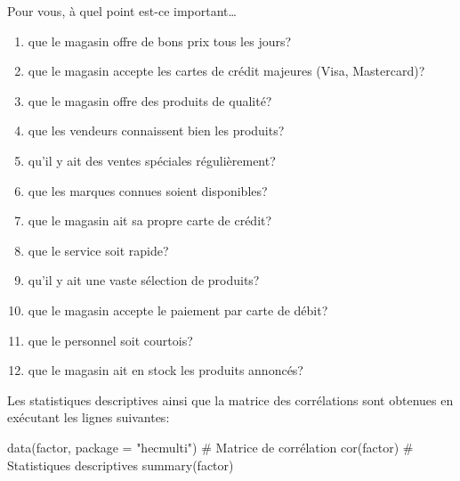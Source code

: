 \documentclass[
  11pt,
  letterpaper,
]{scrbook}
\newenvironment{Shaded}{\begin{snugshade}}{\end{snugshade}}
\newcommand{\AttributeTok}[1]{\textcolor[rgb]{0.40,0.45,0.13}{#1}}
\newcommand{\CommentTok}[1]{\textcolor[rgb]{0.37,0.37,0.37}{#1}}
\newcommand{\FunctionTok}[1]{\textcolor[rgb]{0.28,0.35,0.67}{#1}}
\newcommand{\NormalTok}[1]{\textcolor[rgb]{0.00,0.23,0.31}{#1}}
\newcommand{\StringTok}[1]{\textcolor[rgb]{0.13,0.47,0.30}{#1}}
\providecommand{\tightlist}{%
  \setlength{\itemsep}{0pt}\setlength{\parskip}{0pt}}\usepackage{longtable,booktabs,array}
\theoremstyle{definition}
\theoremstyle{remark}
\begin{document}
Pour vous, à quel point est-ce important\ldots

\begin{enumerate}
\def\labelenumi{\arabic{enumi}.}
\tightlist
\item
  que le magasin offre de bons prix tous les jours?
\item
  que le magasin accepte les cartes de crédit majeures (Visa,
  Mastercard)?
\item
  que le magasin offre des produits de qualité?
\item
  que les vendeurs connaissent bien les produits?
\item
  qu'il y ait des ventes spéciales régulièrement?
\item
  que les marques connues soient disponibles?
\item
  que le magasin ait sa propre carte de crédit?
\item
  que le service soit rapide?
\item
  qu'il y ait une vaste sélection de produits?
\item
  que le magasin accepte le paiement par carte de débit?
\item
  que le personnel soit courtois?
\item
  que le magasin ait en stock les produits annoncés?
\end{enumerate}

Les statistiques descriptives ainsi que la matrice des corrélations sont
obtenues en exécutant les lignes suivantes:

\begin{Shaded}
\begin{Highlighting}[]
\FunctionTok{data}\NormalTok{(factor, }\AttributeTok{package =} \StringTok{"hecmulti"}\NormalTok{)}
\CommentTok{\# Matrice de corrélation}
\FunctionTok{cor}\NormalTok{(factor)}
\CommentTok{\# Statistiques descriptives}
\FunctionTok{summary}\NormalTok{(factor)}
\end{Highlighting}
\end{Shaded}
\end{document}
